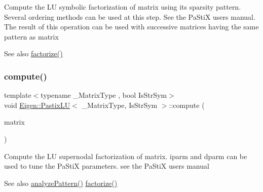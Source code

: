 Compute the LU symbolic factorization of {\ttfamily matrix} using its sparsity pattern. Several ordering methods can be used at this step. See the Pa\+StiX user\textquotesingle{}s manual. The result of this operation can be used with successive matrices having the same pattern as {\ttfamily matrix} \begin{DoxySeeAlso}{See also}
\mbox{\hyperlink{class_eigen_1_1_pastix_l_u_ac178a87b499a2210a402787fbfd98f26}{factorize()}} 
\end{DoxySeeAlso}
\mbox{\label{class_eigen_1_1_pastix_l_u_adc28ee2550086c7bdfe991d624bde2ee}} 
\subsubsection{\texorpdfstring{compute()}{compute()}}
{\footnotesize\ttfamily template$<$typename \+\_\+\+Matrix\+Type , bool Is\+Str\+Sym$>$ \\
void \mbox{\hyperlink{class_eigen_1_1_pastix_l_u}{Eigen\+::\+Pastix\+LU}}$<$ \+\_\+\+Matrix\+Type, Is\+Str\+Sym $>$\+::compute (\begin{DoxyParamCaption}\item[{const Matrix\+Type \&}]{matrix }\end{DoxyParamCaption})\hspace{0.3cm}{\ttfamily [inline]}}

Compute the LU supernodal factorization of {\ttfamily matrix}. iparm and dparm can be used to tune the Pa\+StiX parameters. see the Pa\+StiX user\textquotesingle{}s manual \begin{DoxySeeAlso}{See also}
\mbox{\hyperlink{class_eigen_1_1_pastix_l_u_abae3ca7f1254106d9e2d5e0f273189fa}{analyze\+Pattern()}} \mbox{\hyperlink{class_eigen_1_1_pastix_l_u_ac178a87b499a2210a402787fbfd98f26}{factorize()}} 
\end{DoxySeeAlso}
\mbox{\label{class_eigen_1_1_pastix_l_u_ac178a87b499a2210a402787fbfd98f26}} 
